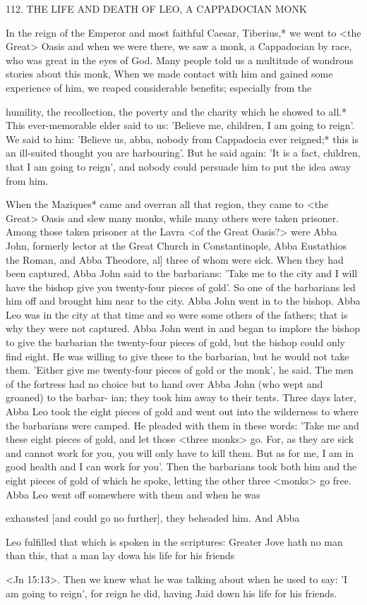 112. THE LIFE AND DEATH OF LEO,
A CAPPADOCIAN MONK

In the reign of the Emperor and most faithful Caesar, Tiberius,* we
went to <the Great> Oasis and when we were there, we saw a
monk, a Cappadocian by race, who was great in the eyes of God.
Many people told us a multitude of wondrous stories about this
monk, When we made contact with him and gained some experience
of him, we reaped considerable benefits; especially from the

humility, the recollection, the poverty and the charity which he
showed to all.* This ever-memorable elder said to us: 'Believe me,
children, I am going to reign'. We said to him: 'Believe us, abba,
nobody from Cappadocia ever reigned;* this is an ill-suited thought
you are harbouring'. But he said again: 'It is a fact, children, that
I am going to reign', and nobody could persuade him to put the
idea away from him.

When the Maziques* came and overran all that region, they
came to <the Great> Oasis and slew many monks, while many
others were taken prisoner. Among those taken prisoner at the
Lavra <of the Great Oasis?> were Abba John, formerly lector at the
Great Church in Constantinople, Abba Eustathios the Roman, and
Abba Theodore, al] three of whom were sick. When they had been
captured, Abba John said to the barbarians: 'Take me to the city
and I will have the bishop give you twenty-four pieces of gold'. So
one of the barbarians led him off and brought him near to the city.
Abba John went in to the bishop. Abba Leo was in the city at that
time and so were some others of the fathers; that is why they were
not captured. Abba John went in and began to implore the bishop
to give the barbarian the twenty-four pieces of gold, but the bishop
could only find eight. He was willing to give these to the barbarian,
but he would not take them. 'Either give me twenty-four pieces of
gold or the monk', he said. The men of the fortress had no choice
but to hand over Abba John (who wept and groaned) to the barbar-
ian; they took him away to their tents. Three days later, Abba Leo
took the eight pieces of gold and went out into the wilderness to
where the barbarians were camped. He pleaded with them in these
words: 'Take me and these eight pieces of gold, and let those <three
monks> go. For, as they are sick and cannot work for you, you will
only have to kill them. But as for me, I am in good health and I can
work for you'. Then the barbarians took both him and the eight
pieces of gold of which he spoke, letting the other three <monks>
go free. Abba Leo went off somewhere with them and when he was

exhausted [and could go no further], they beheaded him. And Abba

Leo fulfilled that which is spoken in the scriptures: Greater Jove
hath no man than this, that a man lay dowa his life for his friends

<Jn 15:13>. Then we knew what he was talking about when he used
to say: 'I am going to reign', for reign he did, having Jaid down his
life for his friends.

